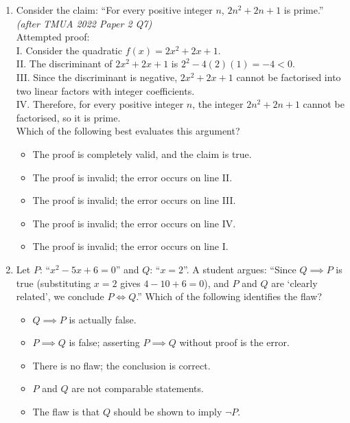 \documentclass[11pt,a4paper]{article}
\begin{document}
\begin{enumerate}

\item Consider the claim: ``For every positive integer $n$, $2n^2+2n+1$ is prime.'' \textit{\small(after TMUA 2022 Paper 2 Q7)}\\
Attempted proof:\\
I. Consider the quadratic $f(x)=2x^2+2x+1$.\\
II. The discriminant of $2x^2+2x+1$ is $2^2-4(2)(1)=-4<0$.\\
III. Since the discriminant is negative, $2x^2+2x+1$ cannot be factorised into two linear factors with integer coefficients.\\
IV. Therefore, for every positive integer $n$, the integer $2n^2+2n+1$ cannot be factorised, so it is prime.\\
Which of the following best evaluates this argument?
\begin{itemize}
\item[A)] The proof is completely valid, and the claim is true.
\item[B)] The proof is invalid; the error occurs on line II.
\item[C)] The proof is invalid; the error occurs on line III.
\item[D)] The proof is invalid; the error occurs on line IV.
\item[E)] The proof is invalid; the error occurs on line I.
\end{itemize}

\item Let $P$: ``$x^2-5x+6=0$'' and $Q$: ``$x=2$''. A student argues: ``Since $Q\implies P$ is true (substituting $x=2$ gives $4-10+6=0$), and $P$ and $Q$ are `clearly related', we conclude $P\iff Q$.'' Which of the following identifies the flaw?
\begin{itemize}
\item[A)] $Q\implies P$ is actually false.
\item[B)] $P\implies Q$ is false; asserting $P\implies Q$ without proof is the error.
\item[C)] There is no flaw; the conclusion is correct.
\item[D)] $P$ and $Q$ are not comparable statements.
\item[E)] The flaw is that $Q$ should be shown to imply $\neg P$.
\end{itemize}


\end{enumerate}
\end{document}
